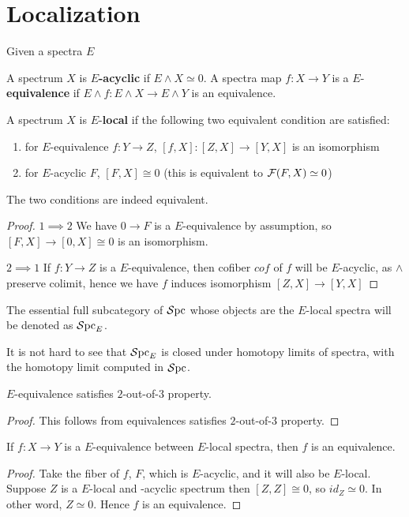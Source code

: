 \section{Localization}\label{sec:preliminary-localization}
Given a spectra $E$
\begin{definition}
    A spectrum $X$ is $E$\textbf{-acyclic }if $E\wedge X\simeq 0$. A spectra map $f:X\to Y$  is a $E$-\textbf{equivalence} if $E\wedge f:E\wedge X\to E\wedge Y$ is an equivalence.

    A spectrum $X$ is $E$-\textbf{local} if the following two equivalent condition are satisfied:
    \begin{enumerate}
        \item for $E$-equivalence $f:Y\to Z$, $[f, X]:[Z, X]\to [Y, X]$ is an isomorphism
        \item for $E$-acyclic $F$, $[F,X]\cong 0$ (this is equivalent to $\mathcal{F}(F, X)\simeq 0$)
    \end{enumerate}
\end{definition}
\begin{lemma}
    The two conditions are indeed equivalent.
\end{lemma}
\begin{proof}
    $1\implies 2$ We have $0\to F$ is a $E$-equivalence by assumption, so $[F, X]\to [0, X]\cong 0$ is an isomorphism.

    $2\implies 1$ If $f:Y\to Z$ is a $E$-equivalence, then cofiber $cof$ of $f$ will be $E$-acyclic, as $\wedge$ preserve colimit, hence we have $f$ induces isomorphism $[Z, X]\to [Y, X]$
\end{proof}

The essential full subcategory of $\operatorname{\mathcal{S}pc}$ whose objects are the $E$-local spectra will be denoted as $\operatorname{\mathcal{S}pc}_E$. 

It is not hard to see that $\operatorname{\mathcal{S}pc}_E$ is closed under homotopy limits of spectra, with the homotopy limit computed in $\operatorname{\mathcal{S}pc}$.

\begin{lemma}
    $E$-equivalence satisfies $2$-out-of-$3$ property.
\end{lemma}
\begin{proof}
    This follows from equivalences satisfies $2$-out-of-$3$ property.
\end{proof}
\begin{proposition}
    If $f:X\to Y$ is a $E$-equivalence between $E$-local spectra, then $f$ is an equivalence.
\end{proposition}
\begin{proof}
    Take the fiber of $f$, $F$, which is $E$-acyclic, and it will also be $E$-local. 
    Suppose $Z$ is a $E$-local and -acyclic spectrum then $[Z,Z]\cong 0$, so $id_Z\simeq 0$. In other word, $Z\simeq0$. Hence $f$ is an equivalence.
\end{proof}

